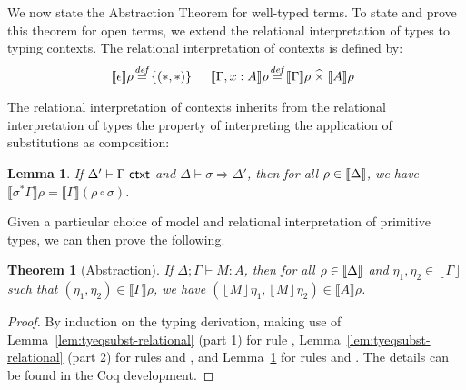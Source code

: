 \documentclass{sigplanconf}
\newcommand{\relTimes}{\mathrel{\widehat\times}}
\newcommand{\isCtxt}{\textup{\textsf{ ctxt}}}
\newcommand{\ctxtSem}[1]{\left\lfloor #1 \right\rfloor}
\newcommand{\tmSem}[1]{\left\lfloor{#1}\right\rfloor}
\newcommand{\rsem}[1]{\llbracket #1 \rrbracket}
\newtheorem{lemma}{Lemma}
\newtheorem{theorem}{Theorem}
\newcommand{\isDefinedAs}{\stackrel{\mathit{def}}=}
\theoremstyle{examplestyle}
\theoremstyle{restatementstyle}
\begin{document}
We now state the Abstraction Theorem for well-typed terms. To state
and prove this theorem for open terms, we extend the
relational interpretation of types to typing contexts. The relational
interpretation of contexts is defined by: %
\begin{displaymath}
  \begin{array}{@{}l@{\hspace{0.1em}\isDefinedAs\hspace{0.1em}}l@{\hspace{1.5em}}l@{\hspace{0.1em}\isDefinedAs\hspace{0.1em}}l}
    \rsem{\epsilon} {\rho} & \{(*,*)\} &
    \rsem{\Gamma, x : A} {\rho} & \rsem{\Gamma} \rho \relTimes \rsem{A} \rho
  \end{array}
\end{displaymath}

The relational interpretation of contexts inherits from the relational
interpretation of types the property of interpreting the application
of substitutions as composition:
\begin{lemma}\label{lem:ctxtsubst-rel}
  If $\Delta' \vdash \Gamma \isCtxt$ and $\Delta \vdash \sigma
  \Rightarrow \Delta'$, then for all $\rho \in \llbracket \Delta \rrbracket$,
we have 
  $\rsem{\sigma^*\Gamma} \rho =
  \rsem{\Gamma}(\rho \circ \sigma)$.
\end{lemma}

Given a particular choice of model and relational interpretation of
primitive types, we can then prove the following.
\begin{theorem}[Abstraction]\label{thm:abstraction}
  If $\Delta; \Gamma \vdash M :
  A$, then for all $\rho \in \llbracket \Delta \rrbracket$ and $\eta_1, \eta_2
  \in \ctxtSem{\Gamma}$ such that $(\eta_1, \eta_2) \in
  \rsem{\Gamma} \rho$, we have $(\tmSem{M}\eta_1,
  \tmSem{M}\eta_2) \in \rsem{A} \rho$.
\end{theorem}
\begin{proof}
By induction on the typing derivation, making use of
Lemma~\ref{lem:tyeqsubst-relational} (part 1) for rule ,
Lemma~\ref{lem:tyeqsubst-relational} (part 2) for rules  and ,
and Lemma~\ref{lem:ctxtsubst-rel} for rules  and . 
The details can be found in the Coq development.
\end{proof}
\end{document}
